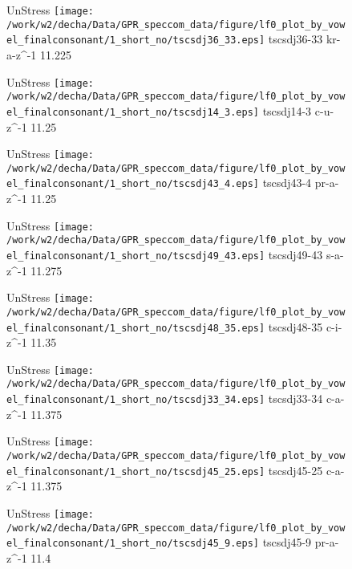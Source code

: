 \documentclass{article}
\begin{document}
\begin{figure}[t]
\begin{minipage}[b]{.24\textwidth}
UnStress
\centering
\texttt{[image: /work/w2/decha/Data/GPR\_speccom\_data/figure/lf0\_plot\_by\_vowel\_finalconsonant/1\_short\_no/tscsdj36\_33.eps]}
tscsdj36-33 kr-a-z\textasciicircum-1 11.225
\end{minipage}
\begin{minipage}[b]{.24\textwidth}
UnStress
\centering
\texttt{[image: /work/w2/decha/Data/GPR\_speccom\_data/figure/lf0\_plot\_by\_vowel\_finalconsonant/1\_short\_no/tscsdj14\_3.eps]}
tscsdj14-3 c-u-z\textasciicircum-1 11.25
\end{minipage}
\begin{minipage}[b]{.24\textwidth}
UnStress
\centering
\texttt{[image: /work/w2/decha/Data/GPR\_speccom\_data/figure/lf0\_plot\_by\_vowel\_finalconsonant/1\_short\_no/tscsdj43\_4.eps]}
tscsdj43-4 pr-a-z\textasciicircum-1 11.25
\end{minipage}
\begin{minipage}[b]{.24\textwidth}
UnStress
\centering
\texttt{[image: /work/w2/decha/Data/GPR\_speccom\_data/figure/lf0\_plot\_by\_vowel\_finalconsonant/1\_short\_no/tscsdj49\_43.eps]}
tscsdj49-43 s-a-z\textasciicircum-1 11.275
\end{minipage}
\end{figure}

\begin{figure}[t]
\begin{minipage}[b]{.24\textwidth}
UnStress
\centering
\texttt{[image: /work/w2/decha/Data/GPR\_speccom\_data/figure/lf0\_plot\_by\_vowel\_finalconsonant/1\_short\_no/tscsdj48\_35.eps]}
tscsdj48-35 c-i-z\textasciicircum-1 11.35
\end{minipage}
\begin{minipage}[b]{.24\textwidth}
UnStress
\centering
\texttt{[image: /work/w2/decha/Data/GPR\_speccom\_data/figure/lf0\_plot\_by\_vowel\_finalconsonant/1\_short\_no/tscsdj33\_34.eps]}
tscsdj33-34 c-a-z\textasciicircum-1 11.375
\end{minipage}
\begin{minipage}[b]{.24\textwidth}
UnStress
\centering
\texttt{[image: /work/w2/decha/Data/GPR\_speccom\_data/figure/lf0\_plot\_by\_vowel\_finalconsonant/1\_short\_no/tscsdj45\_25.eps]}
tscsdj45-25 c-a-z\textasciicircum-1 11.375
\end{minipage}
\begin{minipage}[b]{.24\textwidth}
UnStress
\centering
\texttt{[image: /work/w2/decha/Data/GPR\_speccom\_data/figure/lf0\_plot\_by\_vowel\_finalconsonant/1\_short\_no/tscsdj45\_9.eps]}
tscsdj45-9 pr-a-z\textasciicircum-1 11.4
\end{minipage}
\end{figure}
\end{document}
